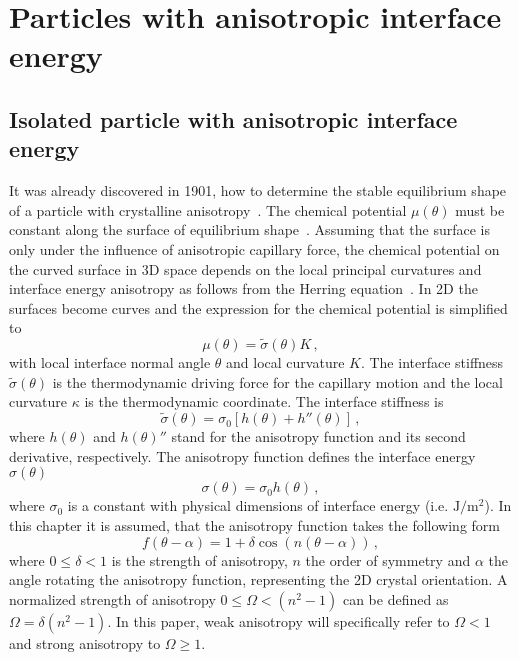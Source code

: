 \chapter{Particles with anisotropic interface energy}\label{ch_anisoIEintro}
\section{Isolated particle with anisotropic interface energy} \label{sec_isol_aniso_particle}
It was already discovered in 1901, how to determine the stable equilibrium shape of a particle with crystalline anisotropy~\cite{Wulff1901}. The chemical potential $\mu(\theta)$ must be constant along the surface of equilibrium shape~\cite{Bao2017}. Assuming that the surface is only under the influence of anisotropic capillary force, the chemical potential on the curved surface in 3D space depends on the local principal curvatures and interface energy anisotropy as follows from the Herring equation~\cite{Herring1951, Johnson1965}. In 2D the surfaces become curves and the expression for the chemical potential is simplified to
\begin{equation}\label{eq_chempot_constant}
	\mu(\theta) = \tilde{\sigma}(\theta)K \,,
\end{equation}
with local interface normal angle $\theta$ and local curvature $K$. The interface stiffness $\tilde{\sigma}(\theta)$ is the thermodynamic driving force for the capillary motion and the local curvature $\kappa$ is the thermodynamic coordinate. The interface stiffness is 
\begin{equation} \label{eq_def_interface_siffness}
	\tilde{\sigma}(\theta)=\sigma_0[h(\theta)+h''(\theta)] \,,
\end{equation}
where $h(\theta)$ and $h(\theta)''$ stand for the anisotropy function and its second derivative, respectively. The anisotropy function defines the interface energy $\sigma(\theta)$
\begin{equation} \label{eq_anisoIE}
	\sigma(\theta) = \sigma_0  h(\theta) \,,
\end{equation}
where $\sigma_0$ is a constant with physical dimensions of interface energy (i.e. $\mathrm{J/m^2}$). In this chapter it is assumed, that the anisotropy function takes the following form 
\begin{equation} \label{eq_anisofun}
	f(\theta -\alpha) = 1+\delta\cos(n(\theta-\alpha)) \,,
\end{equation}
where $0\leq\delta<1$ is the strength of anisotropy, $n$ the order of symmetry and $\alpha$ the angle rotating the anisotropy function, representing the 2D crystal orientation. A normalized strength of anisotropy $0\leq \Omega < (n^2-1)$ can be defined as $\Omega=\delta(n^2-1)$. In this paper, weak anisotropy will specifically refer to $\Omega<1$ and strong anisotropy to $\Omega\geq1$.

